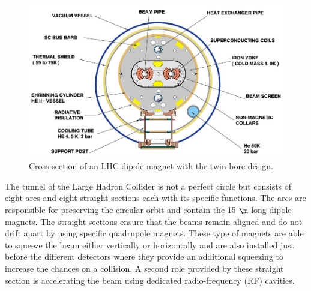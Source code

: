 \begin{figure}[h!t]
 \centering
 \includegraphics[width = 0.6 \textwidth]{Chapters/Chapter2_CERN/Figures/lhc-pho-1998-341.jpg}
 \caption{Cross-section of an LHC dipole magnet with the twin-bore design.}%
 \label{fig::LHCDipole}
\end{figure}

The tunnel of the Large Hadron Collider is not a perfect circle but consists of eight arcs and eight straight sections each with its specific functions. 
The arcs are responsible for preserving the circular orbit and contain the 15 $\m$ long dipole magnets.
The straight sections ensure that the beams remain aligned and do not drift apart by using specific quadrupole magnets. These type of magnets are able to squeeze the beam either vertically or horizontally and are also installed just before the different detectors where they provide an additional squeezing to increase the chances on a collision. A second role provided by these straight section is accelerating the beam using dedicated radio-frequency (RF) cavities.

